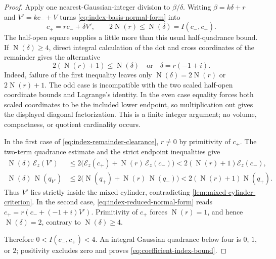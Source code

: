 \documentclass[11pt]{article}
\newcommand{\Norm}[1]{\operatorname{N}\!\left(#1\right)}
\begin{document}
\begin{proof}
Apply one nearest-Gaussian-integer division to $\beta/\delta$.  Writing
$\beta=k\delta+r$ and $V'=kc_-+V$ turns
\eqref{eq:index-basis-normal-form} into
\begin{equation}
\label{eq:index-reduced-normal-form}
                    c_+=r c_-+\delta V',
       \qquad 2\Norm r\le\Norm\delta=I(c_-,c_+).
\end{equation}
The half-open square supplies a little more than this usual half-quadrance
bound.  If $\Norm\delta\ge4$, direct integral calculation of the dot and
cross coordinates of the remainder gives the alternative
\begin{equation}
\label{eq:index-remainder-clearance}
  2(\Norm r+1)\le\Norm\delta
  \quad\text{or}\quad
  \delta=r(-1+i).
\end{equation}
Indeed, failure of the first inequality leaves only
$\Norm\delta=2\Norm r$ or $2\Norm r+1$.  The odd case is incompatible with
the two scaled half-open coordinate bounds and Lagrange's identity.  In the
even case equality forces both scaled coordinates to be the included lower
endpoint, so multiplication out gives the displayed diagonal factorization.
This is a finite integer argument; no volume, compactness, or quotient
cardinality occurs.

In the first case of \eqref{eq:index-remainder-clearance}, $r\ne0$ by
primitivity of $c_+$.  The two-term quadrance estimate and the strict endpoint
inequalities give
\[
 \begin{split}
 \Norm\delta\,\mathcal E_z(V')
 &\le2\bigl(\mathcal E_z(c_+)+\Norm r\,\mathcal E_z(c_-)\bigr)
  <2(\Norm r+1)\mathcal E_z(c_-),\\
 \Norm\delta\,\Norm{q_{V'}}
 &\le2\bigl(\Norm{q_+}+\Norm r\,\Norm{q_-}\bigr)
  <2(\Norm r+1)\Norm{q_+}.
 \end{split}
\]
Thus $V'$ lies strictly inside the mixed cylinder, contradicting
\cref{lem:mixed-cylinder-criterion}.  In the second case,
\eqref{eq:index-reduced-normal-form} reads
$c_+=r(c_-+(-1+i)V')$.  Primitivity of $c_+$ forces $\Norm r=1$, and hence
$\Norm\delta=2$, contrary to $\Norm\delta\ge4$.

Therefore $0<I(c_-,c_+)<4$.  An integral Gaussian quadrance below four is
$0$, $1$, or $2$; positivity excludes zero and proves
\eqref{eq:coefficient-index-bound}.
\end{proof}
\end{document}
